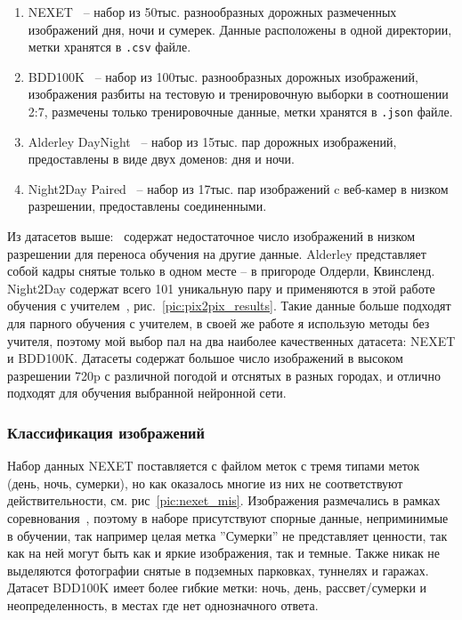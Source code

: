 \documentclass[11pt,a4paper]{extarticle}
\begin{document}
{		\begin{enumerate}
			\item NEXET~\cite{data:nexet} -- набор из 50тыс. разнообразных дорожных размеченных изображений дня, ночи и сумерек. Данные расположены в одной директории, метки хранятся в \texttt{.csv} файле.
			\item BDD100K~\cite{data:bdd100k} -- набор из 100тыс. разнообразных дорожных изображений, изображения разбиты на тестовую и тренировочную выборки в соотношении 2:7, размечены только тренировочные данные, метки хранятся в \texttt{.json} файле.
			\item Alderley DayNight~\cite{data:alderley} -- набор из 15тыс. пар дорожных изображений, предоставлены в виде двух доменов: дня и ночи. 
			\item Night2Day Paired~\cite{data:paired_night2day} -- набор из 17тыс. пар изображений c веб-камер в низком разрешении, предоставлены соединенными.
		\end{enumerate}
		\noindent
		Из датасетов выше:~\cite{data:alderley,data:paired_night2day} содержат недостаточное число изображений в низком разрешении для переноса обучения на другие данные. Alderley представляет собой кадры снятые только в одном месте -- в пригороде Олдерли, Квинсленд.
		Night2Day содержат всего 101 уникальную пару и применяются в этой работе обучения с учителем~\cite{pix2pix}, рис.~\ref{pic:pix2pix_results}.
		Такие данные больше подходят для парного обучения с учителем, в своей же работе я использую методы без учителя, поэтому мой выбор пал на два наиболее качественных датасета: NEXET и BDD100K.
		Датасеты содержат большое число изображений в высоком разрешении 720p с различной погодой и отснятых в разных городах, и отлично подходят для обучения выбранной нейронной сети.
		
		\subsubsection*{Классификация изображений}\label{sec:classify_images}

			Набор данных NEXET поставляется с файлом меток  с тремя типами меток (день, ночь, сумерки), но как оказалось многие из них не соответствуют действительности, см. рис~\ref{pic:nexet_mis}.
			Изображения размечались в рамках соревнования~\cite{data:nexet}, поэтому в наборе присутствуют спорные данные, неприминимые в обучении, так например целая метка ''Сумерки'' не представляет ценности, так как на ней могут быть как и яркие изображения, так и темные.
			Также никак не выделяются фотографии снятые в подземных парковках, туннелях и гаражах.
			Датасет BDD100K имеет более гибкие метки: ночь, день, рассвет/сумерки и неопределенность, в местах где нет однозначного ответа.

}
\end{document}
